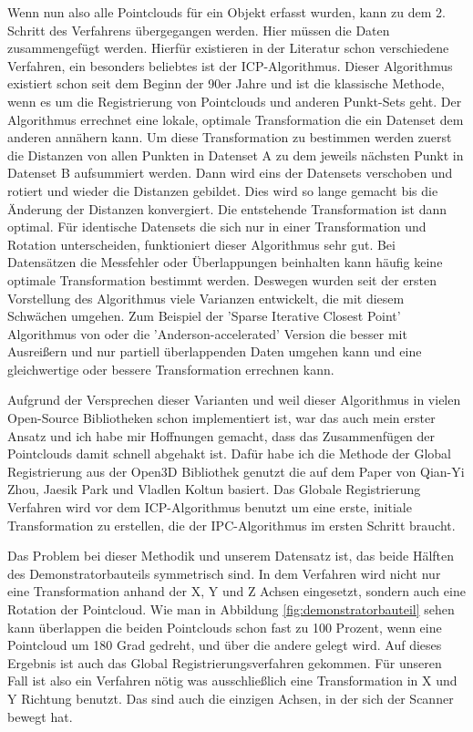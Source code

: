 \documentclass[../main.tex]{subfiles}
\begin{document}
Wenn nun also alle Pointclouds für ein Objekt erfasst wurden, kann zu dem 2.
Schritt des Verfahrens übergegangen werden. Hier müssen die Daten zusammengefügt 
werden. 
Hierfür existieren in der Literatur schon verschiedene Verfahren, ein 
besonders beliebtes ist der ICP-Algorithmus.
Dieser Algorithmus existiert schon seit dem Beginn der 90er Jahre und ist 
die klassische Methode, wenn es um die Registrierung von Pointclouds und 
anderen Punkt-Sets geht. \cite[]{icp}
Der Algorithmus errechnet eine lokale, optimale Transformation die ein Datenset
dem anderen annähern kann. \cite{icp_og}
Um diese Transformation zu bestimmen werden zuerst die Distanzen von allen 
Punkten in Datenset A zu dem jeweils nächsten Punkt in Datenset B aufsummiert 
werden. Dann wird eins der Datensets verschoben und rotiert und wieder die 
Distanzen gebildet. Dies wird so lange gemacht bis die Änderung der Distanzen 
konvergiert. Die entstehende Transformation ist dann optimal.
Für identische Datensets die sich nur in einer Transformation und Rotation 
unterscheiden, funktioniert dieser Algorithmus sehr gut. Bei Datensätzen die 
Messfehler oder Überlappungen beinhalten kann häufig keine optimale 
Transformation bestimmt werden.
Deswegen wurden seit der ersten Vorstellung des Algorithmus viele Varianzen
entwickelt, die mit diesem Schwächen umgehen. 
Zum Beispiel der 'Sparse Iterative Closest Point' Algorithmus von \cite{Bouaziz.2013}
oder die 'Anderson-accelerated' Version die besser mit Ausreißern und nur 
partiell überlappenden Daten umgehen kann und eine gleichwertige oder bessere 
Transformation errechnen kann. \cite{icp}

Aufgrund der Versprechen dieser Varianten und weil dieser Algorithmus in vielen
Open-Source Bibliotheken schon implementiert ist, war das auch mein erster Ansatz
und ich habe mir Hoffnungen gemacht, dass das Zusammenfügen der Pointclouds 
damit schnell abgehakt ist. 
Dafür habe ich die Methode der Global Registrierung aus der Open3D Bibliothek genutzt
die auf dem Paper von Qian-Yi Zhou, Jaesik Park und Vladlen Koltun basiert. \cite{Zhou.}
Das Globale Registrierung Verfahren wird vor dem ICP-Algorithmus benutzt um eine erste, 
initiale Transformation zu erstellen, die der IPC-Algorithmus im ersten Schritt braucht.

Das Problem bei dieser Methodik und unserem Datensatz ist, das beide Hälften des
Demonstratorbauteils symmetrisch sind. In dem Verfahren wird nicht nur eine 
Transformation anhand der X, Y und Z Achsen eingesetzt, 
sondern auch eine Rotation der Pointcloud.
Wie man in Abbildung \ref{fig:demonstratorbauteil} sehen kann überlappen die beiden Pointclouds 
schon fast zu 100 Prozent, wenn eine Pointcloud um 180 Grad gedreht, und über die andere
gelegt wird. Auf dieses Ergebnis ist auch das Global Registrierungsverfahren gekommen. 
Für unseren Fall ist also ein Verfahren nötig was ausschließlich eine 
Transformation in X und Y Richtung benutzt. Das sind auch die einzigen Achsen, 
in der sich der Scanner bewegt hat.
\end{document}
